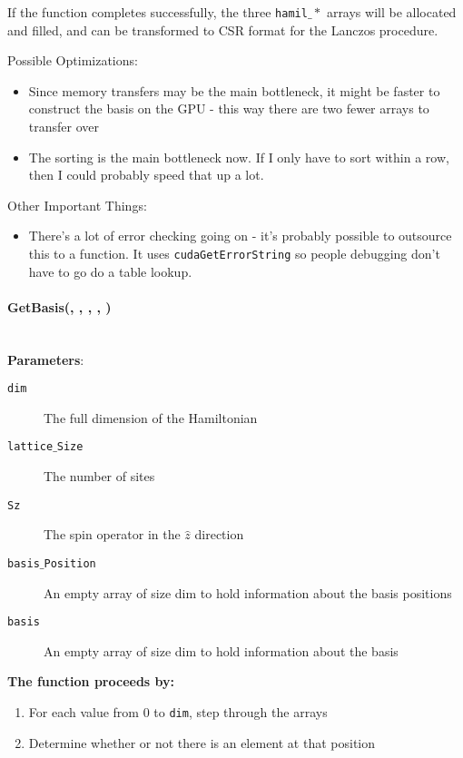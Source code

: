 \documentclass{article}
\begin{document}
If the function completes successfully, the three \texttt{hamil$\_*$} arrays will be allocated and filled, and can be transformed to CSR format for the Lanczos procedure.
 
Possible Optimizations:
\begin{itemize}
\item{Since memory transfers may be the main bottleneck, it might be faster to construct the basis on the GPU - this way there are two fewer arrays to transfer over}
\item{The sorting is the main bottleneck now. If I only have to sort within a row, then I could probably speed that up a lot.}
\end{itemize}

Other Important Things:
\begin{itemize}
\item{ There's a lot of error checking going on - it's probably possible to outsource this to a function. It uses \texttt{cudaGetErrorString} so people debugging don't have to go do a table lookup.}
\end{itemize} 

\paragraph{\host \void GetBasis(\int , \int , \int , \ptrint , \ptrint ) \\ \\}
\noindent\textbf{Parameters}:
\begin{description}
\item[\int \texttt{dim}] The full dimension of the Hamiltonian
\item[\int \texttt{lattice$\_$Size}] The number of sites
\item[\int \texttt{Sz}] The spin operator in the $\hat{z}$ direction
\item[\ptrint \texttt{basis$\_$Position}] An empty array of size dim to hold information about the basis positions
\item[\ptrint \texttt{basis}] An empty array of size dim to hold information about the basis
\end{description}

\noindent\textbf{The function proceeds by:}
\begin{enumerate}
\item{For each value from 0 to \texttt{dim}, step through the arrays}
\item{Determine whether or not there is an element at that position}
\end{enumerate}
\end{document}
